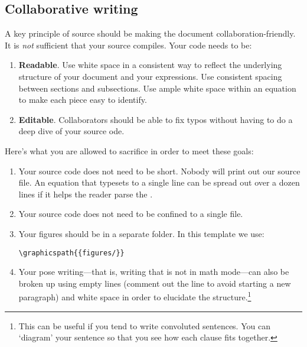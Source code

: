 \subsection{Collaborative writing}

A key principle of \LaTeXx source should be making the document collaboration-friendly. It is \emph{not} sufficient that your \LaTeXx source compiles. Your code needs to be:
\begin{enumerate}
	\item \textbf{Readable}. Use white space in a consistent way to reflect the underlying structure of your document and your expressions. Use consistent spacing between sections and subsections. Use ample white space within an equation to make each piece easy to identify. 
	\item \textbf{Editable}. Collaborators should be able to fix typos without having to do a deep dive of your source ode. 
\end{enumerate}
Here's what you are allowed to sacrifice in order to meet these goals:
\begin{enumerate}
	\item Your source code does not need to be short. Nobody will print out our source file. An equation that typesets to a single line can be spread out over a dozen lines if it helps the reader parse the \LaTeXx. 
	\item Your source code does not need to be confined to a single file. 
	\item Your figures should be in a separate folder. In this template we use:
% 
\begin{lstlisting}[style=latexstyle]
\graphicspath{{figures/}}
\end{lstlisting}
% 
	\item Your pose writing---that is, writing that is not in math mode---can also be broken up using empty lines (comment out the line to avoid starting a new paragraph) and white space in order to elucidate the structure.\footnote{This can be useful if you tend to write convoluted sentences. You can `diagram' your sentence so that you see how each clause fits together.}
\end{enumerate}

